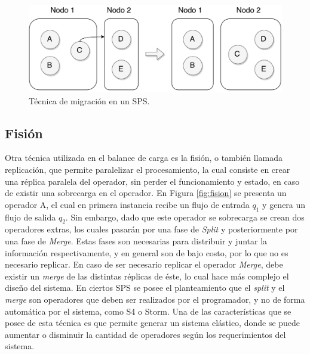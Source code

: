 \begin{figure}[!ht]
	\centering
	\includegraphics[scale=0.45]{images/Migracion.pdf}
	\caption{Técnica de migración en un SPS.}
	\label{fig:migracion}
\end{figure}

\subsection{Fisión}
\label{sec:fisionBC}


Otra técnica utilizada en el balance de carga es la fisión, o también llamada replicación, que permite paralelizar el procesamiento, la cual consiste en crear una réplica paralela del operador, sin perder el funcionamiento y estado, en caso de existir una sobrecarga en el operador. En Figura \ref{fig:fision} se presenta un operador A, el cual en primera instancia recibe un flujo de entrada $q_1$ y genera un flujo de salida $q_2$. Sin embargo, dado que este operador se sobrecarga se crean dos operadores extras, los cuales pasarán por una fase de \textit{Split} y posteriormente por una fase de \textit{Merge}. Estas fases son necesarias para distribuir y juntar la información respectivamente, y en general son de bajo costo, por lo que no es necesario replicar. En caso de ser necesario replicar el operador \textit{Merge}, debe existir un \textit{merge} de las distintas réplicas de éste, lo cual hace más complejo el diseño del sistema. En ciertos SPS se posee el planteamiento que el \textit{split} y el \textit{merge} son operadores que deben ser realizados por el programador, y no de forma automática por el sistema, como S4 o Storm. Una de las características que se posee de esta técnica es que permite generar un sistema elástico, donde se puede aumentar o disminuir la cantidad de operadores según los requerimientos del sistema.

